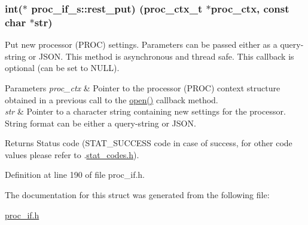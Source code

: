 \subsubsection[{\texorpdfstring{rest\+\_\+put}{rest_put}}]{\setlength{\rightskip}{0pt plus 5cm}int($\ast$ proc\+\_\+if\+\_\+s\+::rest\+\_\+put) ({\bf proc\+\_\+ctx\+\_\+t} $\ast$proc\+\_\+ctx, const char $\ast$str)}\hypertarget{structproc__if__s_acb4d2c240c52904ebd6904f54b1a9b78}{}\label{structproc__if__s_acb4d2c240c52904ebd6904f54b1a9b78}
Put new processor (P\+R\+OC) settings. Parameters can be passed either as a query-\/string or J\+S\+ON. This method is asynchronous and thread safe. This callback is optional (can be set to N\+U\+LL). 
\begin{DoxyParams}{Parameters}
{\em proc\+\_\+ctx} & Pointer to the processor (P\+R\+OC) context structure obtained in a previous call to the \textquotesingle{}\hyperlink{structproc__if__s_a34999576771394dfb721463c8455ba06}{open()}\textquotesingle{} callback method. \\
\hline
{\em str} & Pointer to a character string containing new settings for the processor. String format can be either a query-\/string or J\+S\+ON. \\
\hline
\end{DoxyParams}
\begin{DoxyReturn}{Returns}
Status code (S\+T\+A\+T\+\_\+\+S\+U\+C\+C\+E\+SS code in case of success, for other code values please refer to .\hyperlink{stat__codes_8h}{stat\+\_\+codes.\+h}). 
\end{DoxyReturn}


Definition at line 190 of file proc\+\_\+if.\+h.



The documentation for this struct was generated from the following file\+:\begin{DoxyCompactItemize}
\item 
\hyperlink{proc__if_8h}{proc\+\_\+if.\+h}\end{DoxyCompactItemize}
